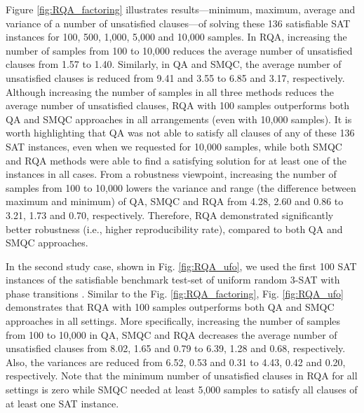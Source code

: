 \documentclass[fleqn,10pt]{wlscirep}
\begin{document}
Figure \ref{fig:RQA_factoring} illustrates results—minimum, maximum, average and variance of a number of unsatisfied clauses—of solving these 136 satisfiable SAT instances for 100, 500, 1,000, 5,000 and 10,000 samples. In RQA, increasing the number of samples from 100 to 10,000 reduces the average number of unsatisfied clauses from 1.57 to 1.40. Similarly, in QA and SMQC, the average number of unsatisfied clauses is reduced from 9.41 and 3.55 to 6.85 and 3.17, respectively. Although increasing the number of samples in all three methods reduces the average number of unsatisfied clauses, RQA with 100 samples outperforms both QA and SMQC approaches in all arrangements (even with 10,000 samples). It is worth highlighting that QA was not able to satisfy all clauses of any of these 136 SAT instances, even when we requested for 10,000 samples, while both SMQC and RQA methods were able to find a satisfying solution for at least one of the instances in all cases. From a robustness viewpoint, increasing the number of samples from 100 to 10,000 lowers the variance and range (the difference between maximum and minimum) of QA, SMQC and RQA from 4.28, 2.60 and 0.86 to 3.21, 1.73 and 0.70, respectively. Therefore, RQA demonstrated significantly better robustness (i.e., higher reproducibility rate), compared to both QA and SMQC approaches. 

In the second study case, shown in Fig. \ref{fig:RQA_ufo}, we used the first 100 SAT instances of the satisfiable benchmark test-set of uniform random 3-SAT with phase transitions \cite{hoos2000satlib}. Similar to the Fig. \ref{fig:RQA_factoring}, Fig. \ref{fig:RQA_ufo} demonstrates that RQA with 100 samples outperforms both QA and SMQC approaches in all settings. More specifically, increasing the number of samples from 100 to 10,000 in QA, SMQC and RQA decreases the average number of unsatisfied clauses from 8.02, 1.65 and 0.79 to 6.39, 1.28 and 0.68, respectively. Also, the variances are reduced from 6.52, 0.53 and 0.31 to 4.43, 0.42 and 0.20, respectively. Note that the minimum number of unsatisfied clauses in RQA for all settings is zero while SMQC needed at least 5,000 samples to satisfy all clauses of at least one SAT instance.
\end{document}
